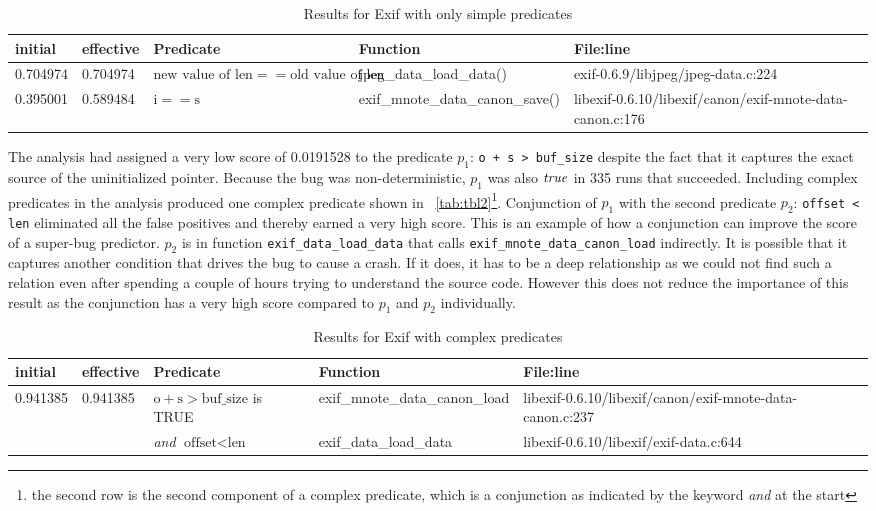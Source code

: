 \begin{table*}
\caption{Results for Exif with only simple predicates}
\label{tab:tbl1}
\centering
\scriptsize
\begin{tabular}{lllll}
\toprule
initial & effective & Predicate & Function & File:line \\
\midrule
0.704974 & 0.704974 & $\text{new value of len} == \text{old value of len}$ & jpeg\_data\_load\_data() & exif-0.6.9/libjpeg/jpeg-data.c:224 \\
0.395001 & 0.589484 & $\text{i} == \text{s}$ & exif\_mnote\_data\_canon\_save() & libexif-0.6.10/libexif/canon/exif-mnote-data-canon.c:176 \\
\bottomrule
\end{tabular}
\end{table*}

The analysis had assigned a very low score of 0.0191528 to the predicate $p_1$: \texttt{o + s > buf\_size} despite the fact that it captures the exact source of the uninitialized pointer.  Because the bug was non-deterministic, $p_1$ was also $\mathit{true}$ in 335 runs that succeeded.  Including complex predicates in the analysis produced one complex predicate shown in ~\autoref{tab:tbl2}{\footnote{the second row is the second component of a complex predicate, which is a conjunction as indicated by the keyword \emph{and} at the start}}.  Conjunction of $p_1$ with the second predicate $p_2$: \texttt{offset < len} eliminated all the false positives and thereby earned a very high score.  This is an example of how a conjunction can improve the score of a super-bug predictor.  $p_2$ is in function \texttt{exif\_data\_load\_data} that calls \texttt{exif\_mnote\_data\_canon\_load} indirectly.  It is possible that it captures another condition that drives the bug to cause a crash.  If it does, it has to be a deep relationship as we could not find such a relation even after spending a couple of hours trying to understand the source code.  However this does not reduce the importance of this result as the conjunction has a very high score compared to $p_1$ and $p_2$ individually.

\begin{table*}
\caption{Results for Exif with complex predicates}
\label{tab:tbl2}
\centering
\scriptsize
\begin{tabular}{lllll}
\toprule
initial & effective & Predicate & Function & File:line \\
\midrule
0.941385 & 0.941385 & $\text{o} + \text{s} > \text{buf\_size}$ is TRUE & exif\_mnote\_data\_canon\_load &
 libexif-0.6.10/libexif/canon/exif-mnote-data-canon.c:237 \\
 
         &          & \emph{and} $\text{offset} < \text{len}$ & exif\_data\_load\_data & libexif-0.6.10/libexif/exif-data.c:644 \\
\bottomrule
\end{tabular}
\end{table*}

